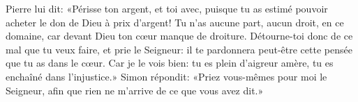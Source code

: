 Pierre lui dit: «Périsse ton argent, et toi avec,
	puisque tu as estimé pouvoir acheter le don de Dieu à prix d’argent!
Tu n’as aucune part, aucun droit, en ce domaine,
	car devant Dieu ton cœur manque de droiture.
Détourne-toi donc de ce mal que tu veux faire, et prie le Seigneur:
	il te pardonnera peut-être cette pensée que tu as dans le cœur.
Car je le vois bien: tu es plein d’aigreur amère, tu es enchaîné dans l’injustice.»
Simon répondit: «Priez vous-mêmes pour moi le Seigneur,
	afin que rien ne m’arrive de ce que vous avez dit.»

